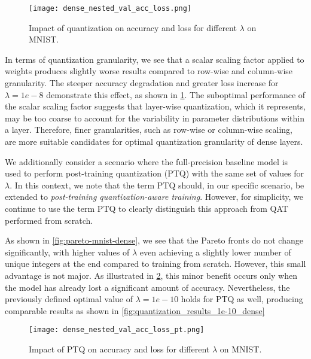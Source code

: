 \begin{figure}[b!]
  \centering
  \texttt{[image: dense\_nested\_val\_acc\_loss.png]}
  \caption{Impact of quantization on accuracy and loss for different \( \lambda \) on MNIST.}
  \label{fig:val-accs-over-epochs-dense}
\end{figure}

In terms of quantization granularity, we see that a scalar scaling factor applied to 
weights produces slightly worse results compared to row-wise and column-wise granularity.
The steeper accuracy degradation and greater loss increase
for \( \lambda = 1e-8\) demonstrate this effect, 
as shown in \cref{fig:val-accs-over-epochs-dense}.
The suboptimal performance of the scalar scaling factor suggests 
that layer-wise quantization, 
which it represents, 
may be too coarse to account for the variability in parameter distributions within a layer.
Therefore, finer granularities, such as row-wise or column-wise scaling, 
are more suitable candidates for optimal quantization granularity of dense layers.

We additionally consider a scenario where the full-precision baseline model is
used to perform post-training quantization (PTQ) with the same set of values for
\( \lambda \). 
In this context, we note that the term PTQ should, in our specific scenario, be extended
to \textit{post-training quantization-aware training}.
However, for simplicity, we continue to use the term PTQ to clearly distinguish this approach from QAT performed from scratch.

As shown
in \cref{fig:pareto-mnist-dense}, we see that the Pareto fronts do not change significantly,
with higher values of \( \lambda \) even achieving a slightly lower number of unique integers at the end
compared to training from scratch.
However, this small advantage is not major. 
As illustrated in \cref{fig:val-accs-over-epochs-dense-pt}, 
this minor benefit occurs only when the model has already lost a significant amount of accuracy.
Nevertheless, the previously defined optimal value of \( \lambda=1e-10 \) holds for PTQ as well,
producing comparable results as shown in \cref{fig:quantization_results_1e-10_dense}

\begin{figure}[b!]
  \centering
  \texttt{[image: dense\_nested\_val\_acc\_loss\_pt.png]}
  \caption{Impact of PTQ on accuracy and loss for different \( \lambda \) on MNIST.}
  \label{fig:val-accs-over-epochs-dense-pt}
\end{figure}

